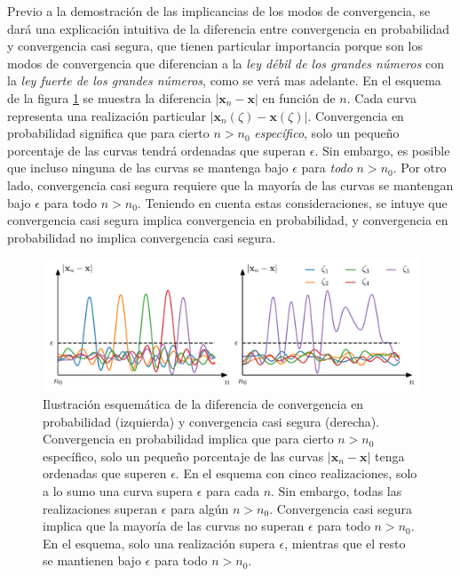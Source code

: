\documentclass[a4paper]{report}
\newcommand{\x}{\mathbf{x}}
\begin{document}
Previo a la demostración de las implicancias de los modos de convergencia, se dará una explicación intuitiva de la diferencia entre convergencia en probabilidad y  convergencia casi segura, que tienen particular importancia porque son los modos de convergencia que diferencian a la \emph{ley débil de los grandes números} con la \emph{ley fuerte de los grandes números}, como se verá mas adelante. En el esquema de la figura \ref{fig:probability_and_as_convergence} se muestra la diferencia \(|\x_n-\x|\) en función de \(n\). Cada curva representa una realización particular \(|\x_n(\zeta)-\x(\zeta)|\). Convergencia en probabilidad significa que para cierto \(n>n_0\) \emph{específico}, solo un pequeño porcentaje de las curvas tendrá ordenadas que superan \(\epsilon\). Sin embargo, es posible que incluso ninguna de las curvas se mantenga bajo \(\epsilon\) para \emph{todo} \(n>n_0\). Por otro lado, convergencia casi segura requiere que la mayoría de las curvas se mantengan bajo \(\epsilon\) para todo \(n>n_0\). Teniendo en cuenta estas consideraciones, se intuye que convergencia casi segura implica convergencia en probabilidad, y convergencia en probabilidad no implica convergencia casi segura.
\begin{figure}[!htb]
\begin{center}
\includegraphics[width=1\columnwidth]{figuras/probability_and_as_convergence.pdf}
\caption{\label{fig:probability_and_as_convergence} Ilustración esquemática de la diferencia de convergencia en probabilidad (izquierda) y convergencia casi segura (derecha). Convergencia en probabilidad implica que para cierto \(n>n_0\) específico, solo un pequeño porcentaje de las curvas \(|\x_n-\x|\) tenga ordenadas que superen \(\epsilon\). En el esquema con cinco realizaciones, solo a lo sumo una curva supera \(\epsilon\) para cada \(n\). Sin embargo, todas las realizaciones superan \(\epsilon\) para algún \(n>n_0\). Convergencia casi segura implica que la mayoría de las curvas no superan \(\epsilon\) para todo \(n>n_0\). En el esquema, solo una realización supera \(\epsilon\), mientras que el resto se mantienen bajo \(\epsilon\) para todo \(n>n_0\).}
\end{center}
\end{figure}
\end{document}
